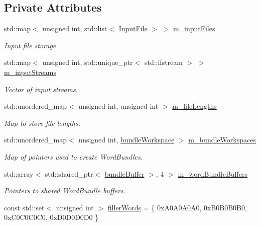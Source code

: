 \subsection*{Private Attributes}
\begin{DoxyCompactItemize}
\item 
std\+::map$<$ unsigned int, std\+::list$<$ \hyperlink{class_input_file}{Input\+File} $>$ $>$ \hyperlink{class_file_reader_a8b144dccc96fcc95e43a96a300341855}{m\+\_\+input\+Files}
\begin{DoxyCompactList}\small\item\em Input file storage. \end{DoxyCompactList}\item 
std\+::map$<$ unsigned int, std\+::unique\+\_\+ptr$<$ std\+::ifstream $>$ $>$ \hyperlink{class_file_reader_af7ac8567ed5b1fa022a8f98099e23f43}{m\+\_\+input\+Streams}
\begin{DoxyCompactList}\small\item\em Vector of input streams. \end{DoxyCompactList}\item 
std\+::unordered\+\_\+map$<$ unsigned int, unsigned int $>$ \hyperlink{class_file_reader_a2d560dd766f6866a1c11cc44e059c246}{m\+\_\+file\+Lengths}
\begin{DoxyCompactList}\small\item\em Map to store file lengths. \end{DoxyCompactList}\item 
std\+::unordered\+\_\+map$<$ unsigned int, \hyperlink{class_file_reader_a7fb625dc45cee3256d37cc19c65cad86}{bundle\+Workspace} $>$ \hyperlink{class_file_reader_aa04e6f9a40c9186cae2c89352e75d69c}{m\+\_\+bundle\+Workspaces}
\begin{DoxyCompactList}\small\item\em Map of pointers used to create Word\+Bundles. \end{DoxyCompactList}\item 
std\+::array$<$ std\+::shared\+\_\+ptr$<$ \hyperlink{class_file_reader_ac755c1e271610c2c12a7fc5b55cc048b}{bundle\+Buffer} $>$, 4 $>$ \hyperlink{class_file_reader_a038d1362d7e0458b3450ab8584eab688}{m\+\_\+word\+Bundle\+Buffers}
\begin{DoxyCompactList}\small\item\em Pointers to shared \hyperlink{class_word_bundle}{Word\+Bundle} buffers. \end{DoxyCompactList}\item 
const std\+::set$<$ unsigned int $>$ \hyperlink{class_file_reader_a7a0bb5e7cb117f6a415f005665893509}{filler\+Words} = \{ 0x\+A0\+A0\+A0\+A0, 0x\+B0\+B0\+B0\+B0, 0x\+C0\+C0\+C0\+C0, 0x\+D0\+D0\+D0\+D0 \}
\end{DoxyCompactItemize}



